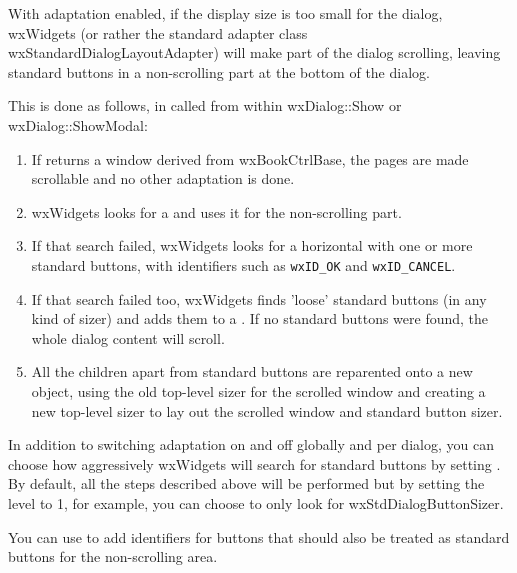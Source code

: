 With adaptation enabled, if the display size is too small for the dialog, wxWidgets (or rather the
standard adapter class wxStandardDialogLayoutAdapter) will
make part of the dialog scrolling, leaving standard buttons in a non-scrolling part at the bottom of the dialog.

This is done as follows, in  called from within wxDialog::Show or wxDialog::ShowModal:

\begin{enumerate}
\item If  returns a window derived from wxBookCtrlBase, the pages are made scrollable and
no other adaptation is done.
\item wxWidgets looks for a  and uses it for the non-scrolling part.
\item If that search failed, wxWidgets looks for a horizontal  with one or more
standard buttons, with identifiers such as {\tt wxID\_OK} and {\tt wxID\_CANCEL}.
\item If that search failed too, wxWidgets finds 'loose' standard buttons (in any kind of sizer) and adds them to a .
If no standard buttons were found, the whole dialog content will scroll.
\item All the children apart from standard buttons are reparented onto a new  object,
using the old top-level sizer for the scrolled window and creating a new top-level sizer to lay out the scrolled window and
standard button sizer.
\end{enumerate}


In addition to switching adaptation on and off globally and per dialog, you can choose how aggressively wxWidgets will
search for standard buttons by setting . By default,
all the steps described above will be performed but by setting the level to 1, for example, you can choose to only look for wxStdDialogButtonSizer.

You can use  to add identifiers for buttons that should also be
treated as standard buttons for the non-scrolling area.

